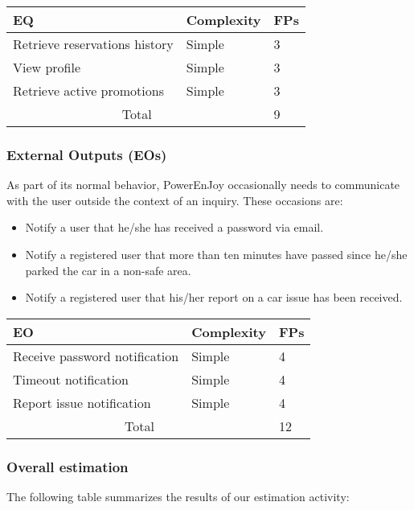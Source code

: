 \begin{table}[H]
	\centering
	\begin{tabular}{| m{5.2cm} | m{2.5cm} | m{1cm} |}
		\hline
		\textbf{EQ} & \textbf{Complexity} & \textbf{FPs}\\
		\hline
		Retrieve reservations history & Simple & 3\\
		View profile & Simple & 3\\
		Retrieve active promotions & Simple & 3\\
		\hline
		\multicolumn{2}{|c|}{Total} & 9\\
		\hline
	\end{tabular}
\end{table}

\subsubsection{External Outputs (EOs)} 
As part of its normal behavior, PowerEnJoy occasionally needs to communicate with the user outside the context of an inquiry. These occasions are:
\begin{itemize}
	\item Notify a user that he/she has received a password via email.
	\item Notify a registered user that more than ten minutes have passed since he/she parked the car in a non-safe area.
	\item Notify a registered user that his/her report on a car issue has been received.
\end{itemize}

\begin{table}[H]
	\centering
	\begin{tabular}{| m{5.3cm} | m{2.5cm} | m{1cm} |}
		\hline
		\textbf{EO} & \textbf{Complexity} & \textbf{FPs}\\
		\hline
		Receive password notification & Simple & 4\\
		Timeout notification & Simple & 4\\
		Report issue notification & Simple & 4\\
		\hline
		\multicolumn{2}{|c|}{Total} & 12\\
		\hline
	\end{tabular}
\end{table}

\subsubsection{Overall estimation}
The following table summarizes the results of our estimation activity:

